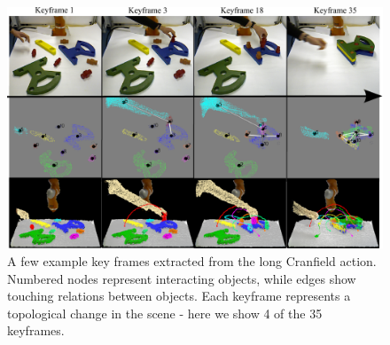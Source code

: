 \begin{figure}[ht!]
  \centering
  \includegraphics[scale=0.84]{figures/IROS2013/SECKF.pdf}
  \caption[Cranfield Key Frames]{A few example key frames extracted from the long Cranfield action. Numbered nodes represent interacting objects, while edges show touching relations between objects. Each keyframe represents a topological change in the scene - here we show 4 of the 35 keyframes.}
  \label{fig:SECGraphs}
\end{figure}

